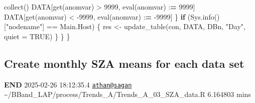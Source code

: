 \documentclass[
  10pt,
  a4paper,oneside]{article}
\newenvironment{Shaded}{\begin{snugshade}}{\end{snugshade}}
\newcommand{\AttributeTok}[1]{\textcolor[rgb]{0.77,0.63,0.00}{#1}}
\newcommand{\ConstantTok}[1]{\textcolor[rgb]{0.00,0.00,0.00}{#1}}
\newcommand{\ControlFlowTok}[1]{\textcolor[rgb]{0.13,0.29,0.53}{\textbf{#1}}}
\newcommand{\DecValTok}[1]{\textcolor[rgb]{0.00,0.00,0.81}{#1}}
\newcommand{\ErrorTok}[1]{\textcolor[rgb]{0.64,0.00,0.00}{\textbf{#1}}}
\newcommand{\FunctionTok}[1]{\textcolor[rgb]{0.00,0.00,0.00}{#1}}
\newcommand{\NormalTok}[1]{#1}
\newcommand{\OtherTok}[1]{\textcolor[rgb]{0.56,0.35,0.01}{#1}}
\newcommand{\SpecialCharTok}[1]{\textcolor[rgb]{0.00,0.00,0.00}{#1}}
\newcommand{\StringTok}[1]{\textcolor[rgb]{0.31,0.60,0.02}{#1}}
\begin{document}
\begin{Shaded}
\begin{Highlighting}[]
                \FunctionTok{collect}\NormalTok{()}
\NormalTok{            DATA[}\FunctionTok{get}\NormalTok{(anomvar) }\SpecialCharTok{\textgreater{}}
                \DecValTok{9999}\NormalTok{, }\FunctionTok{eval}\NormalTok{(anomvar) }\SpecialCharTok{:}\ErrorTok{=}
                \DecValTok{9999}\NormalTok{]}
\NormalTok{            DATA[}\FunctionTok{get}\NormalTok{(anomvar) }\SpecialCharTok{\textless{}}
                \SpecialCharTok{{-}}\DecValTok{9999}\NormalTok{, }\FunctionTok{eval}\NormalTok{(anomvar) }\SpecialCharTok{:}\ErrorTok{=}
                \SpecialCharTok{{-}}\DecValTok{9999}\NormalTok{]}
\NormalTok{        \}}
        \ControlFlowTok{if}\NormalTok{ (}\FunctionTok{Sys.info}\NormalTok{()[}\StringTok{"nodename"}\NormalTok{] }\SpecialCharTok{==}\NormalTok{ Main.Host) \{}
\NormalTok{            res }\OtherTok{\textless{}{-}} \FunctionTok{update\_table}\NormalTok{(con, DATA, DBn, }\StringTok{"Day"}\NormalTok{, }\AttributeTok{quiet =} \ConstantTok{TRUE}\NormalTok{)}
\NormalTok{        \}}
\NormalTok{    \}}
\NormalTok{\}}
\end{Highlighting}
\end{Shaded}

\FloatBarrier
\newpage

\hypertarget{create-monthly-sza-means-for-each-data-set}{%
\subsection{Create monthly SZA means for each data set}\label{create-monthly-sza-means-for-each-data-set}}

\FloatBarrier

\textbf{END} 2025-02-26 18:12:35.4 \href{mailto:athan@sagan}{\nolinkurl{athan@sagan}} \textasciitilde/BBand\_LAP/process/Trends\_A/Trends\_A\_03\_SZA\_data.R 6.164803 mins
\end{document}
